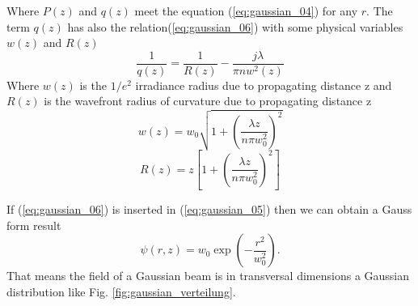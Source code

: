 Where $P(z)$ and $q(z)$ meet the equation (\ref{eq:gaussian_04}) for any $r$. The term $q(z)$ has also the relation(\ref{eq:gaussian_06}) with some physical variables $w(z)$ and $R(z)$
\begin{equation}
\frac{1}{q(z)}=\frac{1}{R(z)}-\frac{j\lambda}{\pi nw^{2}(z)}
\label{eq:gaussian_06}
\end{equation}
Where $w(z)$ is the $1/e^2$ irradiance radius due to propagating distance z and $R(z)$ is the wavefront radius of curvature due to propagating distance z
\begin{equation}
w(z)=w_{0}\sqrt{1+\left(\frac{\lambda z}{n\pi w^{2}_{0}}\right)^{2}}
\label{eq:gaussian_07}
\end{equation}
\begin{equation}
R(z)=z\left[1+\left(\frac{\lambda z}{n\pi w^{2}_{0}}\right)^{2}\right]
\label{eq:gaussian_08}
\end{equation}

If (\ref{eq:gaussian_06}) is inserted in (\ref{eq:gaussian_05}) then we can obtain a Gauss form result 
\begin{equation}
\psi(r,z)=w_{0}\exp\left(-\frac{r^2}{w^2_{0}}\right) \text{.}
\label{eq:gaussian_09}
\end{equation}
That means the field of a Gaussian beam is in transversal dimensions a Gaussian distribution like Fig. \ref{fig:gaussian_verteilung}.\\

